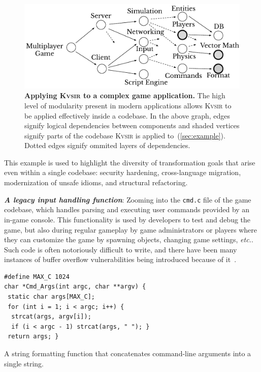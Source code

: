 \documentclass[sigplan,review,anonymous,10pt]{acmart}
\def\etc{{\em etc.}\xspace}
\newcommand{\sys}{{\scshape Kv{\textalpha}sir}\xspace}
\newcommand{\heading}[1]{\vspace{2pt}\noindent\textbf{\emph{#1}}:\enspace}
\newcommand{\ttt}[1]{\texttt{#1}\xspace}
\begin{document}
\begin{figure}[t]
\centering
  \includegraphics[width=.9\columnwidth]{figs/kvasir_application.pdf}
  \caption{\textbf{Applying \sys to a complex game application.}
  The high level of modularity present in modern applications allows \sys to be applied effectively inside a codebase.
  In the above graph, edges signify logical dependencies between components 
  and shaded vertices signify parts of the codebase \sys is applied to~(\cref{sec:example}).
  Dotted edges signify ommited layers of dependencies.
  }
  \label{fig:ex-large-app}
\end{figure}

This example is used to highlight the
diversity of transformation goals that arise even within a single codebase:
security hardening, cross-language migration, modernization of unsafe idioms,
and structural refactoring.

\heading{A legacy input handling function}
Zooming into the \ttt{cmd.c} file of the game codebase, 
which handles parsing and executing user commands provided by an in-game console.
This functionality is used by developers to test and debug the game, but also during regular gameplay
by game administrators or players where they can customize the game by spawning objects, changing game settings, \etc.
Such code is often notoriously difficult to write,
and there have been many instances of buffer overflow vulnerabilities being introduced because of it~\cite{CVE-2006-3400, CVE-2006-3401, CVE-2007-5248, CVE-2019-1010043}.
\begin{listing}
\begin{verbatim}
#define MAX_C 1024
char *Cmd_Args(int argc, char **argv) {
 static char args[MAX_C];
 for (int i = 1; i < argc; i++) {
  strcat(args, argv[i]);
  if (i < argc - 1) strcat(args, " "); }
 return args; }
\end{verbatim}
\caption{A string formatting function that concatenates command-line arguments into a single string.}
\end{listing}
\end{document}
